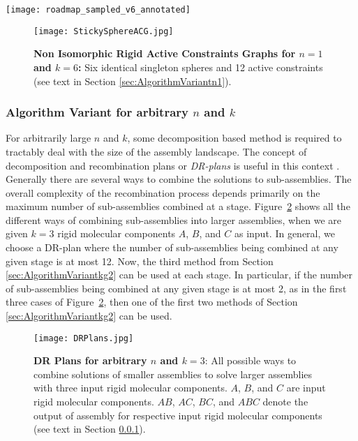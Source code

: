 \documentclass[]{article}
\newcommand{\figref}[1]{Figure~\ref{#1}}
\newcommand{\acgW}{active constraint graph}
\newcommand{\acr}{active constraint region}
\newcommand{\rmc}{rigid molecular component}
\begin{document}
\begin{figure*}[htpb]
\centering
\texttt{[image: roadmap\_sampled\_v6\_annotated]}
\caption{\scriptsize \textbf{Atlas for $n=1$ and $k=6$ Assembly System}: 
The fundamental domain of the roadmap (up to 4D regions) for 
a $k=6,~n=1$ assembly system. Each node represents 
the \acr\ labeled by an \acgW. All the nodes in the same level have the same 
dimension. The red nodes have a non-empty \acr, the white nodes
have no feasible configurations. The graphs on the 
right of each level are the \acgW s of the nodes marked by arrows
		(see text in Section \ref{sec:AlgorithmVariantn1}).}
\label{fig:atlas}
\end{figure*}

\begin{figure}[htpb]
\centering
\texttt{[image: StickySphereACG.jpg]}
\caption{ \scriptsize 
\textbf{Non Isomorphic Rigid Active Constraints Graphs for $n=1$ and $k=6$:} Six identical singleton spheres and 12 active constraints 
(see text in Section \ref{sec:AlgorithmVariantn1}).}
\label{fig:v6e12}
\end{figure}

\subsubsection{Algorithm Variant for arbitrary $n$ and $k$}
\label{sec:AlgorithmVariantnk}
For arbitrarily large $n$ and $k$, some decomposition based method is required
to tractably deal with the size of the assembly landscape. The concept of
decomposition and recombination plans or \emph{DR-plans} is useful in this
context \cite{bib:HoLoSi98b,bib:HoLoSi98c,mvs2006}. Generally there are
several ways to combine the solutions to sub-assemblies. The overall complexity of the
recombination process depends primarily on the maximum number of sub-assemblies combined at 
a stage. \figref{fig:DRPlans} shows all the different ways of combining
sub-assemblies into larger assemblies, when we are given $k=3$ \rmc s $A$, $B$,
and $C$ as input.  In general, we choose a DR-plan where the number of
sub-assemblies being combined at any given stage is at most 12.  Now, the third
method from Section \ref{sec:AlgorithmVariantkg2} can be used at each stage.
In particular, if the number of sub-assemblies being combined at any given stage is
at most 2, as in the first three cases of \figref{fig:DRPlans}, then one of the
first two methods of Section \ref{sec:AlgorithmVariantkg2} can be used.

\begin{figure}[htpb]
\centering
\texttt{[image: DRPlans.jpg]}
\caption{\scriptsize \textbf{DR Plans for arbitrary $n$ and $k=3$}: 
All possible ways to combine
solutions of smaller assemblies to solve larger assemblies with three input
\rmc s. $A$, $B$, and $C$ are input \rmc s. $AB$, $AC$, $BC$, and
$ABC$ denote the output of assembly for respective input \rmc s
(see text in Section \ref{sec:AlgorithmVariantnk}).}
\label{fig:DRPlans}
\end{figure}
\end{document}
